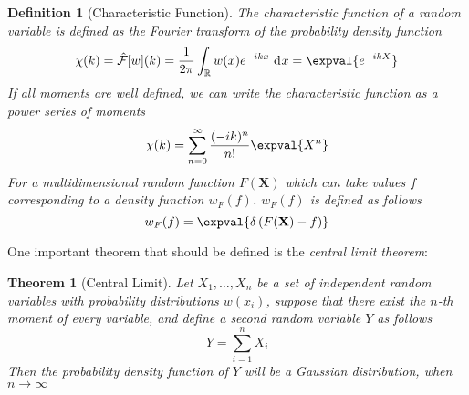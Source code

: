 \documentclass[a4paper, 11pt]{book}
\renewcommand{\vec}[1]{\mathbf{#1}}
\newcommand{\1}{\opr{\mathds{1}}}
\newcommand{\diff}[2][]{\ \mathrm{d}^{#1}#2}
\newcommand{\F}{\hat{\mathcal{F}}}
\newcommand{\R}{\mathbb{R}}
\newtheorem{thm}{Theorem}
\theoremstyle{plain}
\newtheorem{defn}{Definition}
\begin{document}
	\begin{defn}[Characteristic Function]
		The characteristic function of a random variable is defined as the Fourier transform of the probability density function
		\begin{equation*}
			\chi(k)=\F[w](k)=\frac{1}{2\pi}\int_{\R}w(x)e^{-ikx}\diff{x}=\expval{e^{-ikX}}
		\end{equation*}
		If all moments are well defined, we can write the characteristic function as a power series of moments
		\begin{equation*}
			\chi(k)=\sum_{n=0}^{\infty}\frac{(-ik)^n}{n!}\expval{X^n}
		\end{equation*}
		For a multidimensional random function $F(\vec{X})$ which can take values $f$ corresponding to a density function $w_F(f)$. $w_F(f)$ is defined as follows
		\begin{equation*}
			w_F(f)=\expval{\delta\left( F(\vec{X})-f \right)}
		\end{equation*}
	\end{defn}
	One important theorem that should be defined is the \textit{central limit theorem}:
	\begin{thm}[Central Limit]
		Let $X_1,\dots,X_n$ be a set of independent random variables with probability distributions $w(x_i)$, suppose that there exist the $n$-th moment of every variable, and define a second random variable $Y$ as follows
		\begin{equation*}
			Y=\sum_{i=1}^nX_i
		\end{equation*}
		Then the probability density function of $Y$ will be a Gaussian distribution, when $n\to\infty$
	\end{thm}
\end{document}
